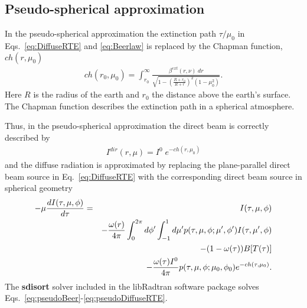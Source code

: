 \subsection{Pseudo-spherical approximation}
In the pseudo-spherical approximation the extinction path
$\tau/\mu_{0}$ in Eqs.~\ref{eq:DiffuseRTE} and \ref{eq:Beerlaw} is
replaced by the Chapman function, $ch(r,\mu_{0})$
\citep{Rees1989B,Dahlback1991}
\begin{eqnarray}
ch(r_{0},\mu_{0})=\int_{r_{0}}^{\infty}
              \frac{\beta^{ext}(r,\nu)\;dr}
        {\sqrt{1-\left(\frac{R+r_{0}}{R+r}\right)^{2}
         \left(1-\mu^{2}_{0}\right)}}.
  \label{eq2.24}
\end{eqnarray}
Here $R$ is the radius of the earth and $r_{0}$ the distance above the
earth's surface. The Chapman function describes the extinction
path in a spherical atmosphere.

Thus, in the pseudo-spherical approximation the direct beam is
correctly described by
\begin{eqnarray}
I^{dir}(r,\mu)=I^{0}\;e^{-ch(r,\mu_{0})}
  \label{eq:pseudoBeer}
\end{eqnarray}
and the diffuse radiation is approximated by replacing the
plane-parallel direct beam source in Eq.~\ref{eq:DiffuseRTE} with the
corresponding direct beam source in spherical geometry
\begin{eqnarray}
 - \mu {dI(\tau,\mu, \phi) \over d\tau}& =& I(\tau,\mu, \phi) 
 \nonumber \\ & & -
  {\omega(r) \over 4\pi } \int^{2\pi}_{0}d\phi' \int^{1}_{-1}d\mu'
   p(\tau,\mu, \phi;\mu', \phi')I(\tau,\mu', \phi)
 \nonumber \\ & & 
   -(1-\omega(\tau))B[T(\tau)] 
\nonumber \\
& &    -\frac{\omega(\tau)I^{0}}{4\pi}p(\tau,\mu, \phi;\mu_{0}, \phi_0 )e^{-ch(\tau,\mu_{0})}.
  \label{eq:pseudoDiffuseRTE}
\end{eqnarray}
The {\bf sdisort} solver included in the libRadtran software package
\citep{mayer2005} solves
Eqs.~\ref{eq:pseudoBeer}-\ref{eq:pseudoDiffuseRTE}. 

